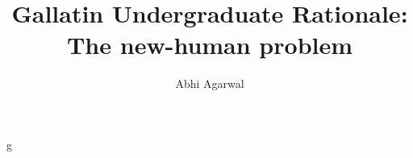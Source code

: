 \documentclass[12pt]{article}
\title{Gallatin Undergraduate Rationale: The new-human problem}
\author{Abhi Agarwal}
\date{}
\begin{document}
\maketitle

\par g
\end{document}

